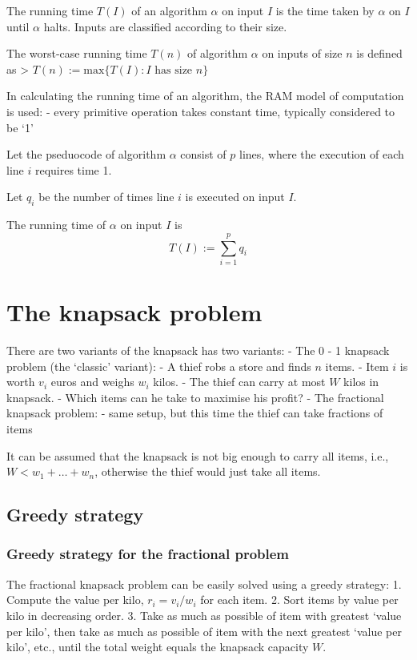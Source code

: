 \documentclass[11pt]{article}
\begin{document}
The running time \(T(I)\) of an algorithm \(\alpha\) on input \(I\) is
the time taken by \(\alpha\) on \(I\) until \(\alpha\) halts. Inputs are
classified according to their size.

The worst-case running time \(T(n)\) of algorithm \(\alpha\) on inputs
of size \(n\) is defined as \textgreater{}
\(T(n) := \text{max}\{T(I) : I \text{ has size } n\}\)

In calculating the running time of an algorithm, the RAM model of
computation is used: - every primitive operation takes constant time,
typically considered to be `1'

Let the pseduocode of algorithm \(\alpha\) consist of \(p\) lines, where
the execution of each line \(i\) requires time 1.

Let \(q_i\) be the number of times line \(i\) is executed on input
\(I\).

The running time of \(\alpha\) on input \(I\) is
\[T(I) := \sum\limits_{i=1}^{p} q_i\]

    \section{The knapsack problem}\label{the-knapsack-problem}

There are two variants of the knapsack has two variants: - The 0 - 1
knapsack problem (the `classic' variant): - A thief robs a store and
finds \(n\) items. - Item \(i\) is worth \(v_i\) euros and weighs
\(w_i\) kilos. - The thief can carry at most \(W\) kilos in knapsack. -
Which items can he take to maximise his profit? - The fractional
knapsack problem: - same setup, but this time the thief can take
fractions of items

It can be assumed that the knapsack is not big enough to carry all
items, i.e., \(W < w_1 + \ldots + w_n\), otherwise the thief would just
take all items.

    \subsection{Greedy strategy}\label{greedy-strategy}

\subsubsection{Greedy strategy for the fractional
problem}\label{greedy-strategy-for-the-fractional-problem}

The fractional knapsack problem can be easily solved using a greedy
strategy: 1. Compute the value per kilo, \(r_i = v_i/w_i\) for each
item. 2. Sort items by value per kilo in decreasing order. 3. Take as
much as possible of item with greatest `value per kilo', then take as
much as possible of item with the next greatest `value per kilo', etc.,
until the total weight equals the knapsack capacity \(W\).
\end{document}
